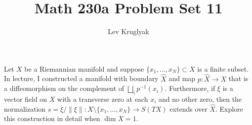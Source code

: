 \documentclass{../../templates/lkx_pset}
\title{Math 230a Problem Set 11}
\author{Lev Kruglyak}
\begin{document}
\maketitle

\begin{problem}{1}
Let $X$ be a Riemannian manifold and suppose $\{x_1,\ldots, x_N\}\subset X$ is a finite subset. In lecture, I constructed a manifold with boundary $\widehat{X}$ and map $p : \widehat{X}\to X$ that is a diffeomorphism on the complement of $\bigsqcup_i p^{-1}(x_i)$. Furthermore, if $\xi$ is a vector field on $X$ with a transverse zero at each $x_i$ and no other zero, then the normalization $s = \xi/\|\xi\| : X\setminus\{x_1,\ldots,x_N\} \to S(TX)$ extends over $\widehat{X}$.
Explore this construction in detail when $\dim X=1$.
\end{problem}
\end{document}
